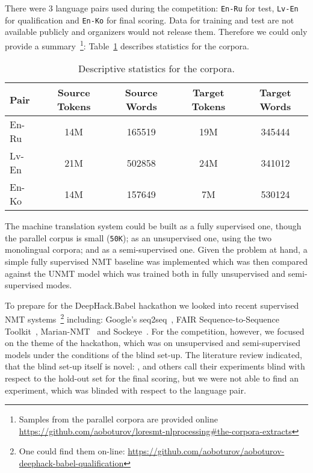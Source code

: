 \documentclass[]{article}
\begin{document}
There were 3 language pairs used during the competition: {\tt En-Ru} for test, {\tt Lv-En} for qualification and {\tt En-Ko} for final scoring.
Data for training and test are not available publicly and organizers would not release them.
Therefore we could only provide a summary~\footnote{Samples from the parallel corpora are provided online \url{https://github.com/aoboturov/loresmt-nlprocessing\#the-corpora-extracts}}: Table~\ref{table:corpora_stats} describes statistics for the corpora.

\begin{table}[h!]
\begin{center}
\begin{tabular}{ l c c c c }
Pair & Source Tokens & Source Words & Target Tokens & Target Words \\
\hline
En-Ru & 14M & 165519 & 19M & 345444 \\
Lv-En & 21M & 502858 & 24M & 341012 \\
En-Ko & 14M & 157649 & 7M & 530124 \\
\end{tabular}
\end{center}
\caption{Descriptive statistics for the corpora.}
\label{table:corpora_stats}
\end{table}

The machine translation system could be built as a fully supervised one, though the parallel corpus is small ({\tt 50K}); as an unsupervised one, using the two monolingual corpora; and as a semi-supervised one.
Given the problem at hand, a simple fully supervised \ac{NMT} baseline was implemented which was then compared against the \ac{UNMT} model which was trained both in fully unsupervised and semi-supervised modes.

To prepare for the {{DeepHack.Babel}} hackathon we looked into recent supervised \ac{NMT} systems~\footnote{One could find them on-line: \url{https://github.com/aoboturov/aoboturov-deephack-babel-qualification}} including: Google's seq2seq~\citep{britz2017massive}, {FAIR Sequence-to-Sequence Toolkit}~\citep{gehring2017convs2s}, {{Marian-NMT}}~\citep{junczys2016neural} and Sockeye~\citep{Sockeye:17}.
For the competition, however, we focused on the theme of the hackathon, which was on unsupervised and semi-supervised models under the conditions of the blind set-up.
The literature review indicated, that the blind set-up itself is novel: \citep{och2004smorgasbord}, \citep{tillmann2004unigram} and others call their experiments blind with respect to the hold-out set for the final scoring, but we were not able to find an experiment, which was blinded with respect to the language pair.
\end{document}
